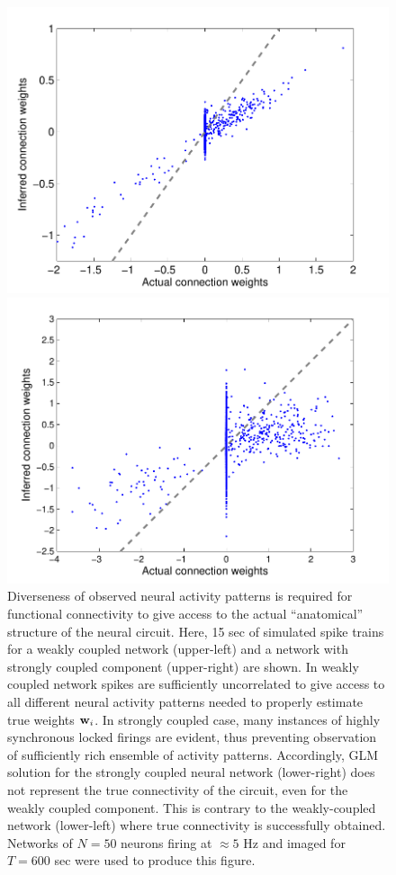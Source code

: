 \begin{figure}[h]
\begin{minipage}[c]{0.45\hsize}
\includegraphics[width=\hsize]{../figs/FigureA8_weak_corr}
\end{minipage}
\begin{minipage}[c]{0.45\hsize}
\includegraphics[width=\hsize]{../figs/FigureA8_strong_corr}
\end{minipage}
\caption{
Diverseness of observed neural activity patterns is required for functional connectivity to give access to the actual ``anatomical'' structure of the neural circuit. Here, 15 sec of simulated spike trains for a weakly coupled network (upper-left) and a network with strongly coupled component (upper-right) are shown. In weakly coupled network spikes are sufficiently uncorrelated to give access to all different neural activity patterns needed to properly estimate true weights ${\bf w}_i$. In strongly coupled case, many instances of highly synchronous locked firings are evident, thus preventing observation of sufficiently rich ensemble of activity patterns. Accordingly, GLM solution for the strongly coupled neural network (lower-right) does not represent the true connectivity of the circuit, even for the weakly coupled component. This is contrary to the weakly-coupled network (lower-left) where true connectivity is successfully obtained. Networks of $N=50$ neurons firing at $\approx 5$ Hz and imaged for $T=600$ sec were used to produce this figure.}

\end{figure}
